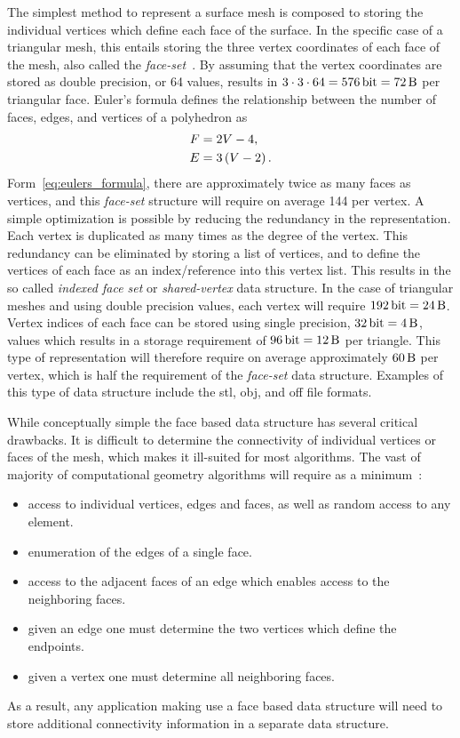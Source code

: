 The simplest method to represent a surface mesh is composed to storing the individual vertices which define each face of the surface.
In the specific case of a triangular mesh, this entails storing the three vertex coordinates of each face of the mesh, also called the \textit{face-set}~\cite{botsch2010}.
By assuming that the vertex coordinates are stored as double precision, or \SI{64}{\bit} values, results in \( 3 \cdot 3 \cdot 64 = \SI{576}{\bit} = \SI{72}{\byte}\) per triangular face.
Euler's formula defines the relationship between the number of faces, edges, and vertices of a polyhedron as
\begin{align}\label{eq:eulers_formula}
    F &= 2 V - 4, \nonumber\\
    E &= 3\left( V -2  \right).
\end{align}
Form~\cref{eq:eulers_formula}, there are approximately twice as many faces as vertices, and this \textit{face-set} structure will require on average \SI{144}{\byte} per vertex.
A simple optimization is possible by reducing the redundancy in the representation.
Each vertex is duplicated as many times as the degree of the vertex.
This redundancy can be eliminated by storing a list of vertices, and to define the vertices of each face as an index/reference into this vertex list.
This results in the so called \textit{indexed face set} or \textit{shared-vertex} data structure.
In the case of triangular meshes and using double precision values, each vertex will require \(\SI{192}{\bit} = \SI{24}{\byte}\).
Vertex indices of each face can be stored using single precision, \( \SI{32}{\bit} = \SI{4}{\byte}\), values which results in a storage requirement of \( \SI{96}{\bit} = \SI{12}{\byte}\) per triangle.
This type of representation will therefore require on average approximately \( \SI{60}{\byte} \) per vertex, which is half the requirement of the \textit{face-set} data structure.
Examples of this type of data structure include the \gls{stl}, \gls{obj}, and \gls{off} file formats.

While conceptually simple the face based data structure has several critical drawbacks.
It is difficult to determine the connectivity of individual vertices or faces of the mesh, which makes it ill-suited for most algorithms.
The vast of majority of computational geometry algorithms will require as a minimum~\cite{botsch2010}:
\begin{itemize}
    \item access to individual vertices, edges and faces, as well as random access to any element.
    \item enumeration of the edges of a single face.
    \item access to the adjacent faces of an edge which enables access to the neighboring faces.
    \item given an edge one must determine the two vertices which define the endpoints.
    \item given a vertex one must determine all neighboring faces.
\end{itemize}
As a result, any application making use a face based data structure will need to store additional connectivity information in a separate data structure.


